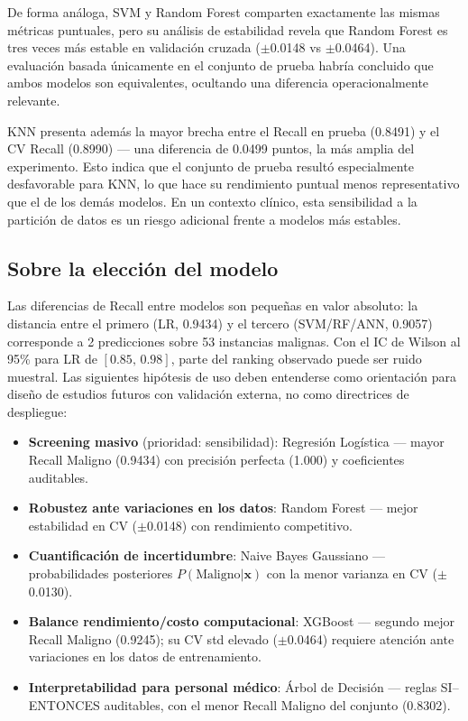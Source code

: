 \documentclass[journal]{IEEEtran}
\begin{document}
De forma análoga, SVM y Random Forest comparten exactamente
las mismas métricas puntuales, pero su análisis de estabilidad revela que Random Forest
es tres veces más estable en validación cruzada
($\pm$0.0148 vs $\pm$0.0464). Una evaluación basada únicamente
en el conjunto de prueba habría concluido que ambos modelos
son equivalentes, ocultando una diferencia operacionalmente
relevante.

KNN presenta además la mayor
brecha entre el Recall en prueba (0.8491) y el CV Recall (0.8990)
— una diferencia de 0.0499 puntos, la más amplia del experimento.
Esto indica que el conjunto de prueba resultó especialmente
desfavorable para KNN, lo que hace su rendimiento puntual
menos representativo que el de los demás modelos. En un
contexto clínico, esta sensibilidad a la partición de datos
es un riesgo adicional frente a modelos más estables.

\subsection{Sobre la elección del modelo}
Las diferencias de Recall entre modelos son pequeñas en valor
absoluto: la distancia entre el primero (LR, 0.9434) y el tercero
(SVM/RF/ANN, 0.9057) corresponde a 2 predicciones sobre 53 instancias
malignas. Con el IC de Wilson al 95\% para LR de $[0.85,\,0.98]$,
parte del ranking observado puede ser ruido muestral. Las
siguientes hipótesis de uso deben entenderse como orientación
para diseño de estudios futuros con validación externa, no como
directrices de despliegue:

\begin{itemize}
  \item \textbf{Screening masivo} (prioridad: sensibilidad):
  Regresión Logística — mayor Recall Maligno (0.9434) con
  precisión perfecta (1.000) y coeficientes auditables.

  \item \textbf{Robustez ante variaciones en los datos}:
  Random Forest — mejor estabilidad en CV ($\pm$0.0148) con
  rendimiento competitivo.

  \item \textbf{Cuantificación de incertidumbre}:
  Naive Bayes Gaussiano — probabilidades posteriores
  $P(\text{Maligno}|\mathbf{x})$ con la menor varianza
  en CV ($\pm$0.0130).

  \item \textbf{Balance rendimiento/costo computacional}:
  XGBoost — segundo mejor Recall Maligno (0.9245); su CV std
  elevado ($\pm$0.0464) requiere atención ante variaciones en
  los datos de entrenamiento.

  \item \textbf{Interpretabilidad para personal médico}:
  Árbol de Decisión — reglas SI–ENTONCES auditables, con el
  menor Recall Maligno del conjunto (0.8302).
\end{itemize}
\end{document}
